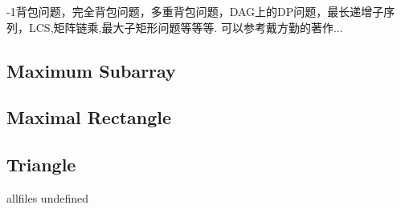 \documentclass{article}
\begin{document}
\begin{CJK}{UTF8}{gbsn}     %

\else
    
-1背包问题，完全背包问题，多重背包问题，DAG上的DP问题，最长递增子序列，LCS,矩阵链乘,最大子矩形问题等等等. 可以参考戴方勤的著作...
\subsection{Maximum Subarray}

\subsection{Maximal Rectangle}

\subsection{Triangle}


\fi

\ifx allfiles undefined
\end{CJK}
\end{document}
